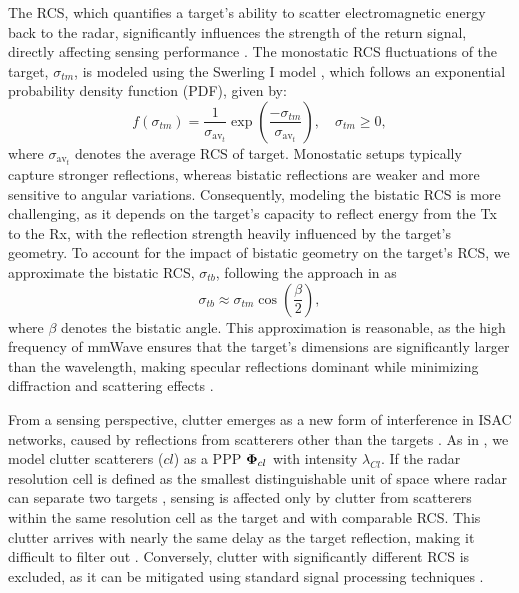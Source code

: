 \documentclass[journal]{IEEEtran}
\begin{document}
 The RCS, which quantifies a target's ability to scatter electromagnetic energy back to the radar, significantly influences the strength of the return signal, directly affecting sensing performance \cite{barton2004radar,willis2005bistatic}. The monostatic RCS fluctuations of the target, $\sigma_{tm}$, is modeled using the Swerling I model \cite{swerling1960probability}, which follows an exponential probability density function (PDF), given by:
\begin{equation}\label{sw1_rcs}
f(\sigma_{tm})=\frac{1}{\sigma_{\text{av}_t}}\exp{\left(\frac{-\sigma_{tm}}{\sigma_{\text{av}_t}}\right)}, \quad \sigma_{tm} \geq 0,           
\end{equation}
where $\sigma_{\text{av}_t}$ denotes the average RCS of target.
Monostatic setups typically capture stronger reflections, whereas bistatic reflections are weaker and more sensitive to angular variations. Consequently, modeling the bistatic RCS is more challenging, as it depends on the target's capacity to reflect energy from the Tx to the Rx, with the reflection strength heavily influenced by the target's geometry.
To account for the impact of bistatic geometry on the target's RCS, we approximate the bistatic RCS, $\sigma_{tb}$, following the approach in \cite{kell1965derivation} as
\begin{equation}\label{rcs_bi_app}
\sigma_{tb} \approx \sigma_{tm} \cos \left( \frac{\beta}{2} \right),
\end{equation}
where \( \beta \) denotes the bistatic angle. This approximation is reasonable, as the high frequency of mmWave ensures that the target's dimensions are significantly larger than the wavelength, making specular reflections dominant while minimizing diffraction and scattering effects \cite{willis2005bistatic}.





From a sensing perspective, clutter emerges as a new form of interference in ISAC networks, caused by reflections from scatterers other than the targets \cite{liu2022integrated,zhang2021enabling,wei2023integrated}. As in \cite{chen2012integrated}, we model clutter scatterers ($cl$) as a PPP $\bold\Phi_{cl}$  with intensity $\lambda_{Cl}$. 
If the radar resolution cell is defined as the smallest distinguishable unit of space where radar can separate two targets \cite{barton2004radar,willis2005bistatic},  sensing is affected only by clutter from scatterers within the same resolution cell as the target and with comparable RCS. This clutter arrives with nearly the same delay as the target reflection, making it difficult to filter out \cite{shnidman2005radar}.
Conversely, clutter with significantly different RCS is excluded, as it can be mitigated using standard signal processing techniques \cite{rahman2019framework}.
\end{document}

